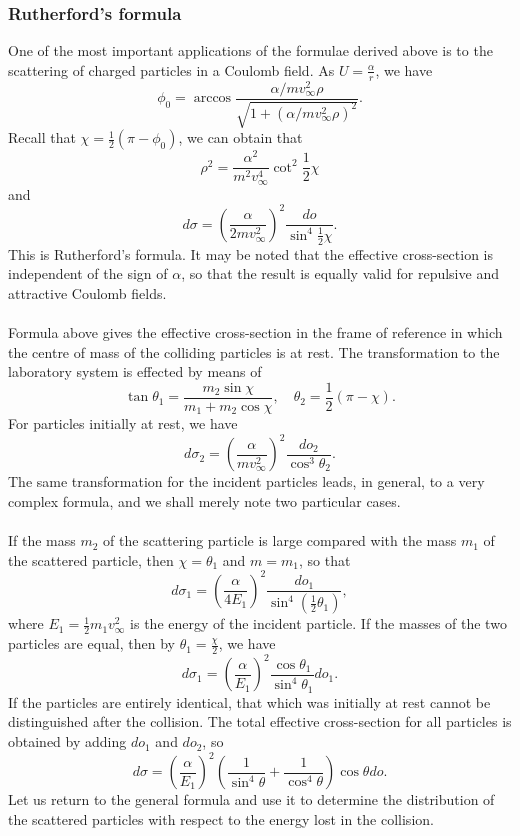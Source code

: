 \subsubsection{Rutherford's formula}
One of the most important applications of the formulae derived above is to the scattering of charged particles in a Coulomb field. As $U = \frac{\alpha}{r}$, we have
\[\phi_0 = \arccos \frac{\alpha/mv^2_{\infty}\rho}{\sqrt{1+(\alpha/mv^2_{\infty}\rho)^2}}.\]
Recall that $\chi = \frac{1}{2}(\pi-\phi_0)$, we can obtain that
\[\rho^2 = \frac{\alpha^2}{m^2v_{\infty}^4} \cot^2 \frac{1}{2}\chi \]
and
\[d\sigma = \left( \frac{\alpha}{2mv_{\infty}^2} \right)^2 \frac{do}{\sin^4 \frac{1}{2}\chi}.\]
This is Rutherford's formula. It may be noted that the effective cross-section is independent of the sign of $\alpha$, so that the result is equally valid for repulsive and attractive Coulomb fields.
\\ \\
Formula above gives the effective cross-section in the frame of reference in which the centre of mass of the colliding particles is at rest. The transformation to the laboratory system is effected by means of
\[\tan\theta_1 = \frac{m_2\sin\chi}{m_1 + m_2 \cos\chi} ,\quad \theta_2 = \frac{1}{2}(\pi - \chi).\]
For particles initially at rest, we have
\[d\sigma_2 = \left ( \frac{\alpha}{mv^2_{\infty}} \right )^2 \frac{do_2}{\cos^3 \theta_2}.\]
The same transformation for the incident particles leads, in general, to a very complex formula, and we shall merely note two particular cases.
\\ \\
If the mass $m_2$ of the scattering particle is large compared with the mass $m_1$ of the scattered particle, then $\chi = \theta_1$ and $m = m_1$, so that
\[d\sigma_1 = \left ( \frac{\alpha}{4E_1}\right )^2 \frac{do_1}{\sin^4 (\frac{1}{2}\theta_1)} ,\]
where $E_1 = \frac{1}{2}m_1v^2_{\infty}$ is the energy of the incident particle.
If the masses of the two particles are equal, then by $\theta_1 = \frac{\chi}{2}$, we have
\[d\sigma_1 =  \left ( \frac{\alpha}{E_1}\right )^2 \frac{\cos\theta_1}{\sin^4\theta_1} do_1.\]
If the particles are entirely identical, that which was initially at rest cannot be distinguished after the collision. The total effective cross-section for all
particles is obtained by adding $do_1$ and $do_2$, so
\[d\sigma = \left ( \frac{\alpha}{E_1}\right )^2 \left ( \frac{1}{\sin^4\theta} + \frac{1}{\cos^4\theta} \right )\cos\theta do.\]
Let us return to the general formula and use it to determine the distribution of the scattered particles with respect to the energy lost in the collision. 
